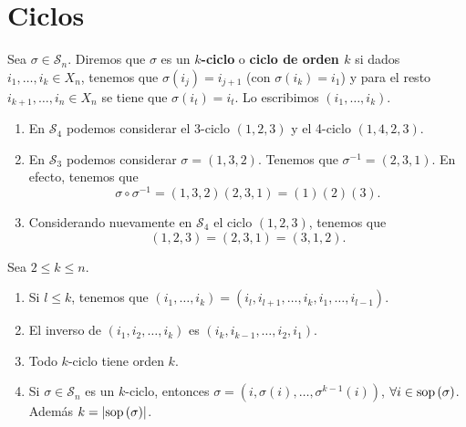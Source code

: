 \section{Ciclos}
\begin{definition}[Ciclo]
Sea $\displaystyle \sigma \in \mathcal{S}_{n} $. Diremos que $\displaystyle \sigma  $ es un \textbf{ $\displaystyle k $-ciclo} o \textbf{ciclo de orden $\displaystyle k $} si dados $\displaystyle i_{1}, \ldots, i_{k} \in X_{n} $, tenemos que $\displaystyle \sigma\left(i_{j}\right)=i_{j+1} $ (con $\displaystyle \sigma\left(i_{k}\right)=i_{1} $) y para el resto $\displaystyle i_{k+1}, \ldots, i_{n} \in X_{n} $ se tiene que $\displaystyle \sigma\left(i_{t}\right) = i_{t} $. Lo escribimos $\displaystyle \left(i_{1}, \ldots, i_{k}\right) $.
\end{definition}
\begin{eg}
\begin{enumerate}
\item En $\displaystyle \mathcal{S}_{4} $ podemos considerar el 3-ciclo $\displaystyle \left(1,2,3\right) $ y el 4-ciclo $\displaystyle \left(1,4,2,3\right) $. 
\item En $\displaystyle \mathcal{S}_{3} $ podemos considerar $\displaystyle \sigma = \left(1,3,2\right) $. Tenemos que $\displaystyle \sigma^{-1} = \left(2,3,1\right) $. En efecto, tenemos que
	\[\sigma \circ \sigma^{-1} = \left(1,3,2\right)\left(2,3,1\right) = \left(1\right)\left(2\right)\left(3\right) .\]
\item Considerando nuevamente en $\displaystyle \mathcal{S}_{4} $ el ciclo $\displaystyle \left(1,2,3\right) $, tenemos que 
	\[\left(1,2,3\right) = \left(2,3,1\right) = \left(3,1,2\right) .\]
\end{enumerate}
\end{eg}
\begin{prop}
Sea $\displaystyle 2 \leq k \leq n $. 
\begin{enumerate}
\item Si $\displaystyle l \leq k $, tenemos que $\displaystyle \left(i_{1}, \ldots, i_{k}\right) = \left(i_{l}, i_{l+1}, \ldots, i_{k}, i_{1}, \ldots, i_{l-1}\right) $.
\item El inverso de $\displaystyle \left(i_{1}, i_{2}, \ldots, i_{k}\right) $ es $\displaystyle \left(i_{k}, i_{k-1}, \ldots, i_{2}, i_{1}\right) $.
\item Todo $\displaystyle k $-ciclo tiene orden $\displaystyle k $.
\item Si $\displaystyle \sigma \in \mathcal{S}_{n} $ es un $\displaystyle k $-ciclo, entonces $\displaystyle \sigma = \left(i, \sigma\left(i\right), \ldots, \sigma^{k-1}\left(i\right)\right) $, $\displaystyle \forall i \in \operatorname{sop}\left(\sigma \right) $. Además $\displaystyle k = \left|\operatorname{sop}\left(\sigma \right)\right| $. 
\end{enumerate}
\end{prop}
